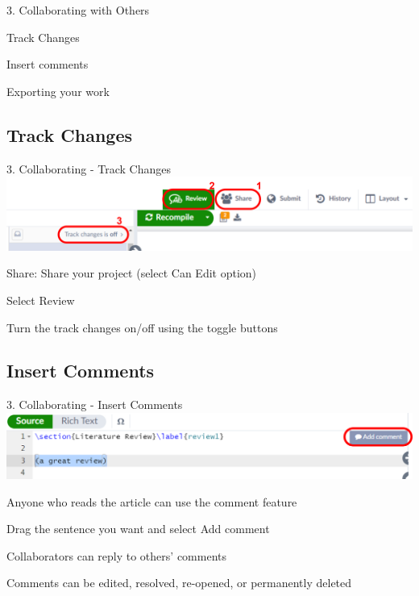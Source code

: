 \documentclass[13pt]{beamer}
\newcommand{\itemA}{\item[\textcolor{black}{\textbullet}]}
\newcommand{\green}{\textcolor{colorgreen}}
\begin{document}
\begin{frame}{3. Collaborating with Others}
 \begin{fullpageitemize}
    \itemA Track Changes
    \itemA Insert comments
    \itemA Exporting your work
 \end{fullpageitemize}
\end{frame}

\subsection{Track Changes}
\begin{frame}{3. Collaborating - Track Changes}
\includegraphics[width=\textwidth,keepaspectratio]{images/share.png}
    \hfill \break
 \begin{fullpageitemize}
    \itemA \green{Share}: Share your project (select \green{Can Edit} option) 
    \itemA Select \green{Review}
    \itemA Turn the \green{track changes} on/off using the toggle buttons
 \end{fullpageitemize}
\end{frame}

\subsection{Insert Comments}
\begin{frame}{3. Collaborating - Insert Comments}
\includegraphics[width=\textwidth,keepaspectratio]{images/comment.png}
    \hfill \break
 \begin{fullpageitemize}
    \itemA Anyone who reads the article can use the comment feature
    \itemA Drag the sentence you want and select  \green{Add comment}
    \itemA Collaborators can reply to others' comments
    \itemA Comments can be edited, resolved, re-opened, or permanently deleted
 \end{fullpageitemize}
\end{frame}
\end{document}
